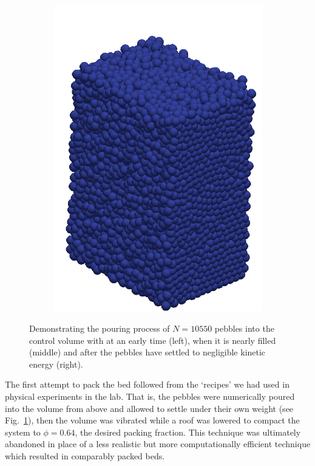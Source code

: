 \begin{figure}[!ht]
\begin{subfigure}[b]{0.25\textwidth}
        \includegraphics[width=\textwidth]{figures/fill03.png}
    \end{subfigure}
    \caption{Demonstrating the pouring process of $N = 10550$ pebbles into the control volume with at an early time (left), when it is nearly filled (middle) and after the pebbles have settled to negligible kinetic energy (right).}
\label{fig:fill01}
\end{figure}

The first attempt to pack the bed followed from the `recipes' we had used in physical experiments in the lab. That is, the pebbles were numerically poured into the volume from above and allowed to settle under their own weight (see Fig.~\ref{fig:fill01}), then the volume was vibrated while a roof was lowered to compact the system to $\phi = 0.64$, the desired packing fraction. This technique was ultimately abandoned in place of a less realistic but more computationally efficient technique which resulted in comparably packed beds.

